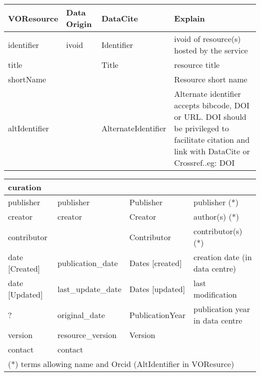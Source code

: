 \documentclass[11pt,a4paper]{ivoa}
\begin{document}
\label{tab:voresourcemapping}
\begin{tabular}{|p{3cm}|p{3cm}|p{3cm}|p{5cm}|} \hline 
\textbf{VOResource} & \textbf{Data Origin} & \textbf{DataCite} & \textbf{Explain} \\ \hline
identifier    &ivoid & Identifier & ivoid of resource(s) hosted by the service\\ \hline
title         & & Title& resource title\\ \hline
shortName     &&& Resource short name\\ \hline
altIdentifier &  & AlternateIdentifier&
              Alternate identifier accepts bibcode, DOI or URL. DOI should be privileged to facilitate citation and link with DataCite or Crossref..eg: DOI \\ \hline
\end{tabular}

\begin{tabular}{|p{3cm}|p{3cm}|p{3cm}|p{5cm}|} \hline
\multicolumn{4}{|l|}{\textbf{curation}} \\ \hline
publisher     & publisher & Publisher &publisher (*)\\ \hline
creator       & creator & Creator & author(s) (*)\\ \hline
contributor   & & Contributor & contributor(s) (*)\\ \hline
date [Created]&  publication\_date  & Dates [created] & creation date (in data centre)\\ \hline
date [Updated]&  last\_update\_date & Dates [updated] & last modification\\ \hline
  ?           &  original\_date & PublicationYear & publication year in data centre\\ \hline
version       & resource\_version & Version &\\ \hline
contact       & contact &&\\ \hline
\multicolumn{4}{l}{\small \footnotesize(*) terms allowing name and Orcid (AltIdentifier in VOResurce)} \\
\end{tabular}
\end{document}
